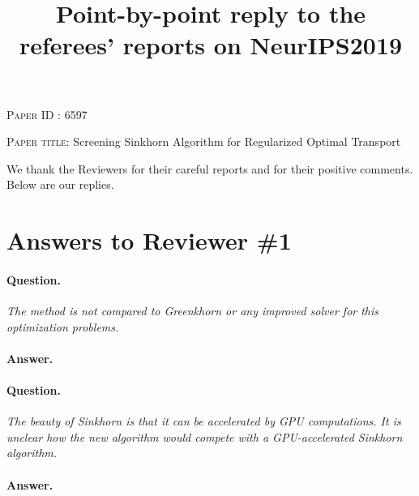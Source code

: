 \documentclass[11pt]{article}
\begin{document}
\title{Point-by-point reply to the referees' reports on NeurIPS2019}


\date{}

\maketitle

\begin{flushleft}

  \textsc{Paper ID :} 6597

  \textsc{Paper title:} Screening Sinkhorn Algorithm for Regularized Optimal Transport
\end{flushleft}

\maketitle

We thank the Reviewers for their careful reports and for their positive comments.
Below are our replies.

\section{Answers to Reviewer \#1}

\paragraph{Question.}

\emph{The method is not compared to Greenkhorn or any improved solver
for this optimization problems.}

\paragraph{Answer.} 

\paragraph{Question.}

\emph{The beauty of Sinkhorn is that it can be accelerated by GPU computations.
It is unclear how the new algorithm would compete with a GPU-accelerated
Sinkhorn algorithm.}

\paragraph{Answer.} 
\end{document}
